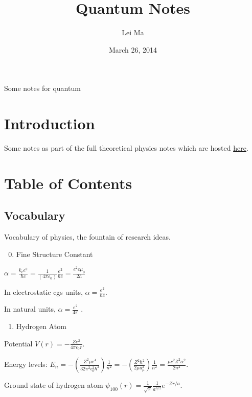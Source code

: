 \documentclass[letterpaper,10pt,english]{sphinxmanual}
\title{Quantum Notes}
\date{March 26, 2014}
\author{Lei Ma}
\begin{document}
\maketitle
\tableofcontents
{}\label{index::doc}


Some notes for quantum


\chapter{Introduction}
\label{index:introduction}\label{index:quantum-notes}
Some notes as part of the full theoretical physics notes which are hosted \href{http://cosmologytaskforce.github.io/PhysicsResearchSurvivalManual/}{here}.


\chapter{Table of Contents}
\label{index:table-of-contents}

\section{Vocabulary}
\label{vocabulary::doc}\label{vocabulary:vocabulary}
Vocabulary of physics, the fountain of research ideas.
\begin{enumerate}
\setcounter{enumi}{-1}
\item {} 
Fine Structure Constant

\end{enumerate}

$\alpha = \frac{k_\mathrm{e} e^2}{\hbar c} = \frac{1}{(4 \pi \varepsilon_0)} \frac{e^2}{\hbar c} = \frac{e^2 c \mu_0}{2 h}$

In electrostatic cgs units, $\alpha = \frac{e^2}{\hbar c}$.

In natural units, $\alpha = \frac{e^2}{4 \pi}$ .
\begin{enumerate}
\item {} 
Hydrogen Atom

\end{enumerate}

Potential $V(r) = -\frac{Z e^2}{4\pi \epsilon_0 r}$.

Energy levels: $E_{n} = -\left(\frac{Z^2 \mu e^4}{32 \pi^2\epsilon_0^2\hbar^2}\right)\frac{1}{n^2} = -\left(\frac{Z^2\hbar^2}{2\mu a_{\mu}^2}\right)\frac{1}{n^2} = \frac{\mu c^2Z^2\alpha^2}{2n^2}.$

Ground state of hydrogen atom $\psi_{100}(r)=\frac{1}{\sqrt{\pi}}\frac{1}{a^{3/2}} e^{-Z r/a}$.
\end{document}
